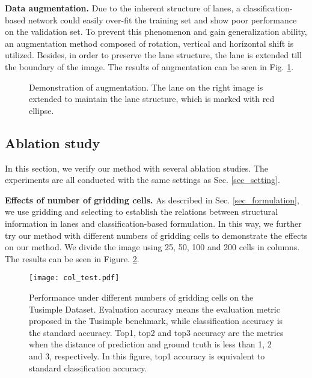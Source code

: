 \documentclass[runningheads]{llncs}
\begin{document}
\noindent
\textbf{Data augmentation.}
Due to the inherent structure of lanes, a classification-based network could easily over-fit the training set and show poor performance on the validation set. To prevent this phenomenon and gain generalization ability, an augmentation method composed of rotation, vertical and horizontal shift is utilized. Besides, in order to preserve the lane structure, the lane is extended till the boundary of the image. The results of augmentation can be seen in Fig. \ref{fig_aug}.
\begin{figure}
	\centering
	\caption{Demonstration of augmentation. The lane on the right image is extended to maintain the lane structure, which is marked with red ellipse.}
	\label{fig_aug}
	\vspace{-10pt}
\end{figure}

\subsection{Ablation study}
In this section, we verify our method with several ablation studies. The experiments are all conducted with the same settings as Sec. \ref{sec_setting}.

\noindent
\textbf{Effects of number of gridding cells.}
\label{ab_griding}
As described in Sec. \ref{sec_formulation}, we use gridding and selecting to establish the relations between structural information in lanes and classification-based formulation. In this way, we further try our method with different numbers of gridding cells to demonstrate the effects on our method. We divide the image using 25, 50, 100 and 200 cells in columns. The results can be seen in Figure. \ref{fig_griding}. 
\begin{figure}[h]
	\centering
	\texttt{[image: col\_test.pdf]}
	\caption{Performance under different numbers of gridding cells on the Tusimple Dataset. Evaluation accuracy means the evaluation metric proposed in the Tusimple benchmark, while classification accuracy is the standard accuracy. Top1, top2 and top3 accuracy are the metrics when the distance of prediction and ground truth is less than 1, 2 and 3, respectively. In this figure, top1 accuracy is equivalent to standard classification accuracy.}
	\label{fig_griding}
	\vspace{-10pt}
\end{figure}
\end{document}
